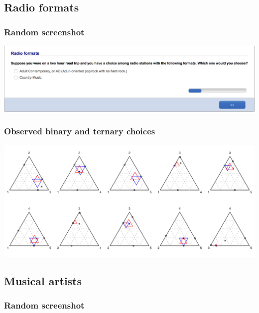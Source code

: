 \documentclass[11pt,letter]{article}
\begin{document}
\pagebreak

\subsection{Radio formats}



\subsubsection*{Random screenshot}

\includegraphics[width=15cm]{Population_study_design/screenshot_Radio_Formats.png}

\subsubsection*{Observed binary and ternary choices}

\includegraphics[width=15cm]{./Population_study_data/Simplexes/Radio_formats.pdf}

\pagebreak

\subsection{Musical artists}



\subsubsection*{Random screenshot}
\end{document}
